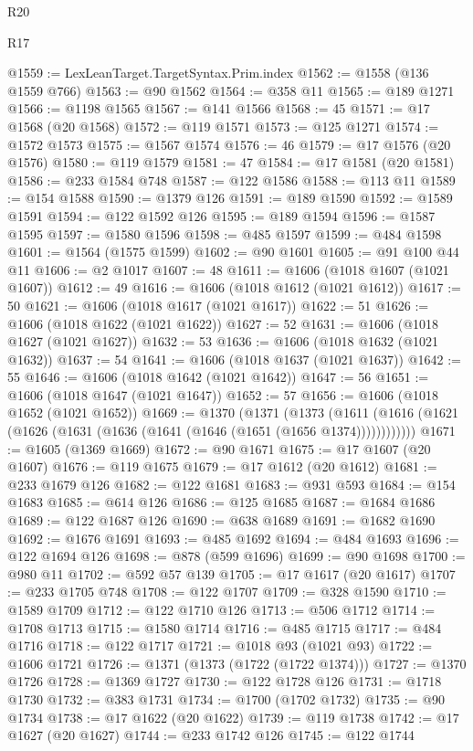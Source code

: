 \begin{lexlean}{R20}
\begin{lexlean}{R17}
\begin{coremodule}
{{{{{{{{{{{{{{{{{{{{{{{{{{{{{{{{{{{{{{{{{{{{{{{{{{{{{{{{{{{{{{{{{{{{{{{{{{{{{{{{{{{{{{{{{{{{{{{{{{{{{{{{{{{@1559 := LexLeanTarget.TargetSyntax.Prim.index
@1562 := @1558 (@136 @1559 @766)
@1563 := @90 @1562
@1564 := @358 @11
@1565 := @189 @1271
@1566 := @1198 @1565
@1567 := @141 @1566
@1568 := 45
@1571 := @17 @1568 (@20 @1568)
@1572 := @119 @1571
@1573 := @125 @1271
@1574 := @1572 @1573
@1575 := @1567 @1574
@1576 := 46
@1579 := @17 @1576 (@20 @1576)
@1580 := @119 @1579
@1581 := 47
@1584 := @17 @1581 (@20 @1581)
@1586 := @233 @1584 @748
@1587 := @122 @1586
@1588 := @113 @11
@1589 := @154 @1588
@1590 := @1379 @126
@1591 := @189 @1590
@1592 := @1589 @1591
@1594 := @122 @1592 @126
@1595 := @189 @1594
@1596 := @1587 @1595
@1597 := @1580 @1596
@1598 := @485 @1597
@1599 := @484 @1598
@1601 := @1564 (@1575 @1599)
@1602 := @90 @1601
@1605 := @91 @100 @44 @11
@1606 := @2 @1017
@1607 := 48
@1611 := @1606 (@1018 @1607 (@1021 @1607))
@1612 := 49
@1616 := @1606 (@1018 @1612 (@1021 @1612))
@1617 := 50
@1621 := @1606 (@1018 @1617 (@1021 @1617))
@1622 := 51
@1626 := @1606 (@1018 @1622 (@1021 @1622))
@1627 := 52
@1631 := @1606 (@1018 @1627 (@1021 @1627))
@1632 := 53
@1636 := @1606 (@1018 @1632 (@1021 @1632))
@1637 := 54
@1641 := @1606 (@1018 @1637 (@1021 @1637))
@1642 := 55
@1646 := @1606 (@1018 @1642 (@1021 @1642))
@1647 := 56
@1651 := @1606 (@1018 @1647 (@1021 @1647))
@1652 := 57
@1656 := @1606 (@1018 @1652 (@1021 @1652))
@1669 := @1370
    (@1371
      (@1373 (@1611 (@1616 (@1621 (@1626 (@1631 (@1636 (@1641 (@1646 (@1651 (@1656 @1374))))))))))))
@1671 := @1605 (@1369 @1669)
@1672 := @90 @1671
@1675 := @17 @1607 (@20 @1607)
@1676 := @119 @1675
@1679 := @17 @1612 (@20 @1612)
@1681 := @233 @1679 @126
@1682 := @122 @1681
@1683 := @931 @593
@1684 := @154 @1683
@1685 := @614 @126
@1686 := @125 @1685
@1687 := @1684 @1686
@1689 := @122 @1687 @126
@1690 := @638 @1689
@1691 := @1682 @1690
@1692 := @1676 @1691
@1693 := @485 @1692
@1694 := @484 @1693
@1696 := @122 @1694 @126
@1698 := @878 (@599 @1696)
@1699 := @90 @1698
@1700 := @980 @11
@1702 := @592 @57 @139
@1705 := @17 @1617 (@20 @1617)
@1707 := @233 @1705 @748
@1708 := @122 @1707
@1709 := @328 @1590
@1710 := @1589 @1709
@1712 := @122 @1710 @126
@1713 := @506 @1712
@1714 := @1708 @1713
@1715 := @1580 @1714
@1716 := @485 @1715
@1717 := @484 @1716
@1718 := @122 @1717
@1721 := @1018 @93 (@1021 @93)
@1722 := @1606 @1721
@1726 := @1371 (@1373 (@1722 (@1722 @1374)))
@1727 := @1370 @1726
@1728 := @1369 @1727
@1730 := @122 @1728 @126
@1731 := @1718 @1730
@1732 := @383 @1731
@1734 := @1700 (@1702 @1732)
@1735 := @90 @1734
@1738 := @17 @1622 (@20 @1622)
@1739 := @119 @1738
@1742 := @17 @1627 (@20 @1627)
@1744 := @233 @1742 @126
@1745 := @122 @1744
}}}}}}}}}}}}}}}}}}}}}}}}}}}}}}}}}}}}}}}}}}}}}}}}}}}}}}}}}}}}}}}}}}}}}}}}}}}}}}}}}}}}}}}}}}}}}}}}}}}}}}}}}}}
\end{coremodule}
\end{lexlean}
\end{lexlean}
